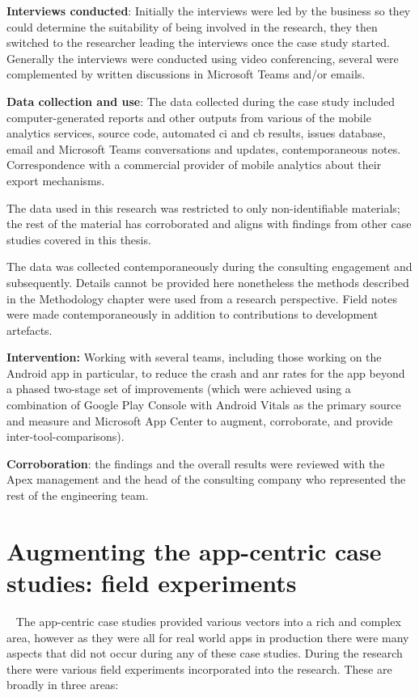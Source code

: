 \textbf{Interviews conducted}: Initially the interviews were led by the business so they could determine the suitability of being involved in the research, they then switched to the researcher leading the interviews once the case study started. Generally the interviews were conducted using video conferencing, several were complemented by written discussions in Microsoft Teams and/or emails.

\textbf{Data collection and use}:
The data collected during the case study included computer-generated reports and other outputs from various of the mobile analytics services, source code, automated \acrfull{ci} and \acrfull{cb} results, issues database, email and Microsoft Teams conversations and updates, contemporaneous notes. Correspondence with a commercial provider of mobile analytics about their export mechanisms. 

The data used in this research was restricted to only non-identifiable materials; the rest of the material has corroborated and aligns with findings from other case studies covered in this thesis.

The data was collected contemporaneously during the consulting engagement and subsequently. Details cannot be provided here nonetheless the methods described in the Methodology chapter were used from a research perspective. Field notes were made contemporaneously in addition to contributions to development artefacts. 

\textbf{Intervention:} 
Working with several teams, including those working on the Android app in particular, to reduce the crash and \acrshort{anr} rates for the app beyond a phased two-stage set of improvements (which were achieved using a combination of Google Play Console with Android Vitals as the primary source and measure and Microsoft App Center to augment, corroborate, and provide inter-tool-comparisons).

\textbf{Corroboration}: the findings and the overall results were reviewed with the Apex management and the head of the consulting company who represented the rest of the engineering team.




\section{Augmenting the app-centric case studies: field experiments}~\label{section-field-experiments-to-augment-app-centric-case-studies}
The app-centric case studies provided various vectors into a rich and complex area, however as they were all for real world apps in production there were many aspects that did not occur during any of these case studies. During the research there were various field experiments incorporated into the research. These are broadly in three areas:

